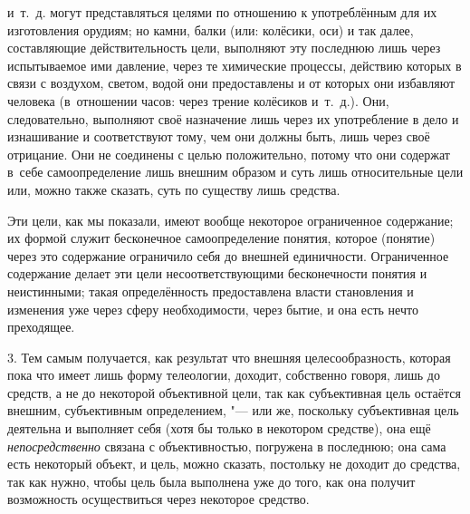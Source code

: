 и~т.~д. могут представляться целями по отношению к употреблённым для их
изготовления орудиям; но камни, балки (или: колёсики, оси) и так далее,
составляющие действительность цели, выполняют эту последнюю лишь через
испытываемое ими давление, через те химические процессы, действию которых в
связи с воздухом, светом, водой они предоставлены и от которых они
избавляют человека (в~отношении часов: через трение колёсиков и~т.~д.).
Они, следовательно, выполняют своё назначение лишь через их употребление в
дело и изнашивание и соответствуют тому, чем они должны быть, лишь через
своё отрицание. Они не соединены с целью положительно, потому что они
содержат в~себе самоопределение лишь внешним образом и суть лишь
относительные цели или, можно также сказать, суть по существу лишь
средства.

Эти цели, как мы показали, имеют вообще некоторое ограниченное
содержание; их формой служит бесконечное самоопределение понятия, которое
(понятие) через это содержание ограничило себя до внешней единичности.
Ограниченное содержание делает эти цели несоответствующими бесконечности
понятия и неистинными; такая определённость предоставлена власти
становления и изменения уже через сферу необходимости, через бытие, и она
есть нечто преходящее.

3. Тем самым получается, как результат что внешняя
целесообразность, которая пока что имеет лишь форму телеологии, доходит,
собственно говоря, лишь до средств, а не до некоторой объективной цели, так
как субъективная цель остаётся внешним, субъективным определением, "---
или же, поскольку субъективная цель деятельна и выполняет
себя (хотя бы только в некотором средстве), она ещё
{\em непосредственно}
связана с объективностью, погружена в последнюю; она сама
есть некоторый объект, и цель, можно сказать, постольку не доходит до
средства, так как нужно, чтобы цель была выполнена уже до того, как она
получит возможность осуществиться через некоторое средство.

